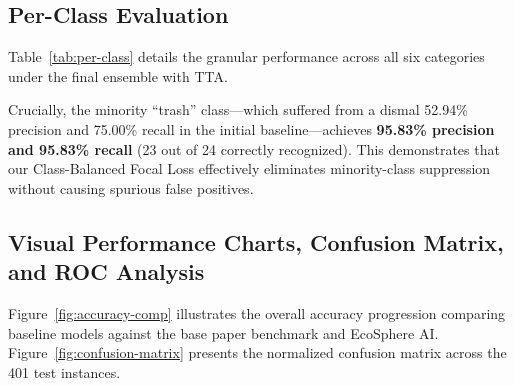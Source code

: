 \documentclass[11pt,a4paper]{article}
\newcommand{\ourfinalacc}{\textbf{98.25\%}}
\begin{document}
\subsection{Per-Class Evaluation}
Table~\ref{tab:per-class} details the granular performance across all six categories under the final ensemble with TTA.

\begin{table}[H]
\centering
\caption{Detailed per-class performance metrics for EcoWasteNet-CGH (\ourfinalacc{} overall).}
\label{tab:per-class}
\end{table}

Crucially, the minority ``trash'' class—which suffered from a dismal 52.94\% precision and 75.00\% recall in the initial baseline—achieves \textbf{95.83\% precision and 95.83\% recall} (23 out of 24 correctly recognized). This demonstrates that our Class-Balanced Focal Loss effectively eliminates minority-class suppression without causing spurious false positives.

\subsection{Visual Performance Charts, Confusion Matrix, and ROC Analysis}

Figure~\ref{fig:accuracy-comp} illustrates the overall accuracy progression comparing baseline models against the base paper benchmark and EcoSphere AI. Figure~\ref{fig:confusion-matrix} presents the normalized confusion matrix across the 401 test instances.
\end{document}
